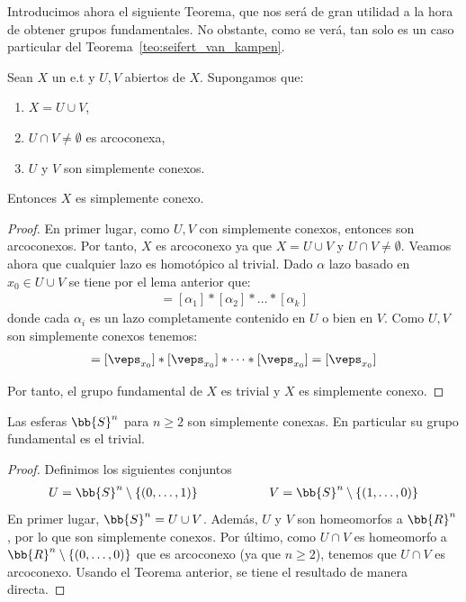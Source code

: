 Introducimos ahora el siguiente Teorema, que nos será de gran utilidad a la hora de obtener grupos fundamentales. No obstante, como se verá, tan solo es un caso particular del Teorema~\ref{teo:seifert_van_kampen}.
\begin{teo}\label{teo:union_abiertos_simply_conexo}
    Sean $X$ un e.t y $U,V$ abiertos de $X$. Supongamos que:
    \begin{enumerate}
        \item $X=U\cup V$,
        \item $U\cap V\neq \emptyset$ es arcoconexa,
        \item $U$ y $V$ son simplemente conexos.
    \end{enumerate}
    Entonces $X$ es simplemente conexo.
    \begin{proof}
        En primer lugar, como $U,V$ con simplemente conexos, entonces son arcoconexos. Por tanto, $X$ es arcoconexo ya que $X=U\cup V$ y $U\cap V\neq \emptyset$. Veamos ahora que cualquier lazo es homotópico al trivial. Dado $\alpha$ lazo basado en $x_0\in U\cup V$ se tiene por el lema anterior que: 
        \begin{gather*}
            [\alpha] = [\alpha_1]\ast [\alpha_2] \ast \dots \ast [\alpha_k]
        \end{gather*}
        donde cada $\alpha_i$ es un lazo completamente contenido en $U$ o bien en $V$. Como $U,V$ son simplemente conexos tenemos:
        \begin{gather*}
            [\alpha] = [\veps_{x_0}]\ast[\veps_{x_0}]\ast \dots \ast [\veps_{x_0}] = [\veps_{x_0}]
        \end{gather*}

        Por tanto, el grupo fundamental de $X$ es trivial y $X$ es simplemente conexo.
    \end{proof}
\end{teo}

\begin{coro}
    Las esferas $\bb{S}^n$ para $n\geq 2$ son simplemente conexas. En particular su grupo fundamental es el trivial.

    \begin{proof}
        Definimos los siguientes conjuntos
        \begin{gather*}
            U=\bb{S}^n \setminus \{(0,\dots,1)\} \hspace{2cm} 
            V = \bb{S}^n \setminus \{(1,\dots,0)\}
        \end{gather*}
        En primer lugar, $\bb{S}^n=U\cup V$. Además, $U$ y $V$ son homeomorfos a $\bb{R}^n$, por lo que son simplemente conexos. Por último, como $U\cap V$ es homeomorfo a $\bb{R}^n \setminus \{(0,\dots,0)\}$ que es arcoconexo (ya que $n\geq 2$), tenemos que $U\cap V$ es arcoconexo. Usando el Teorema anterior, se tiene el resultado de manera directa.
    \end{proof}
\end{coro}

